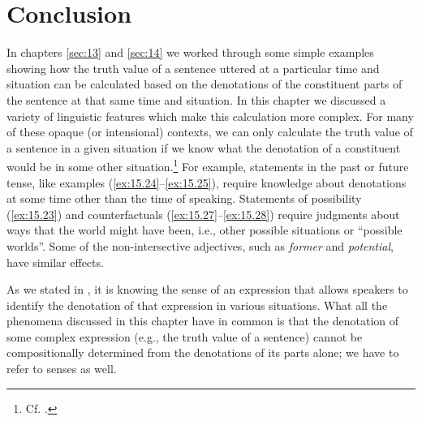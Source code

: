 \section{Conclusion}\label{sec:15.7}
In chapters \ref{sec:13} and \ref{sec:14} we worked through some simple examples showing how the truth value of a sentence uttered at a particular time and situation can be calculated based on the denotations of the constituent parts of the sentence at that same time and situation. In this chapter we discussed a variety of linguistic features which make this calculation more complex. For many of these opaque (or intensional) contexts, we can only calculate the truth value of a sentence in a given situation if we know what the denotation of a constituent would be in some other situation.\footnote{Cf. \citet[204–208]{ChierchiaMcConnell-Ginet1990}.} For example, statements in the past or future tense, like examples (\ref{ex:15.24}--\ref{ex:15.25}), require knowledge about denotations at some time other than the time of speaking. Statements of possibility (\ref{ex:15.23}) and counterfactuals (\ref{ex:15.27}--\ref{ex:15.28}) require judgments about ways that the world might have been, i.e., other possible situations or “possible worlds”. Some of the non-intersective adjectives, such as \textit{former} and \textit{potential}, have similar effects.



As we stated in , it is knowing the sense of an expression that allows speakers to identify the denotation of that expression in various situations. What all the phenomena discussed in this chapter have in common is that the denotation of some complex expression (e.g., the truth value of a sentence) cannot be compositionally determined from the denotations of its parts alone; we have to refer to senses as well.



